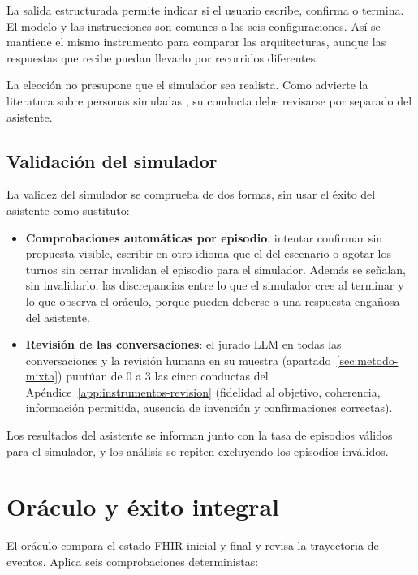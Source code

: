 La salida estructurada permite indicar si el usuario escribe, confirma o
termina. El modelo y las instrucciones son comunes a las seis configuraciones.
Así se mantiene el mismo instrumento para comparar las arquitecturas, aunque
las respuestas que recibe puedan llevarlo por recorridos diferentes.

La elección no presupone que el simulador sea realista. Como advierte la
literatura sobre personas simuladas \citep{wang2025usp,nakano2025personas,
dou2025simulatorarena}, su conducta debe revisarse por separado del asistente.

\subsection{Validación del simulador}

La validez del simulador se comprueba de dos formas, sin usar el éxito del
asistente como sustituto:

\begin{itemize}
  \item \textbf{Comprobaciones automáticas por episodio}: intentar confirmar sin
        propuesta visible, escribir en otro idioma que el del escenario o agotar
        los turnos sin cerrar invalidan el episodio para el simulador. Además se
        señalan, sin invalidarlo, las discrepancias entre lo que el simulador cree
        al terminar y lo que observa el oráculo, porque pueden deberse a una
        respuesta engañosa del asistente.
  \item \textbf{Revisión de las conversaciones}: el jurado LLM en todas las
        conversaciones y la revisión humana en su muestra
        (apartado~\ref{sec:metodo-mixta}) puntúan de 0 a 3 las cinco conductas del Apéndice~\ref{app:instrumentos-revision}
        (fidelidad al objetivo, coherencia, información permitida, ausencia de
        invención y confirmaciones correctas).
\end{itemize}

Los resultados del asistente se informan junto con la tasa de episodios válidos
para el simulador, y los análisis se repiten excluyendo los episodios inválidos.

\section{Oráculo y éxito integral}
\label{sec:metodo-oraculo}

El oráculo compara el estado FHIR inicial y final y revisa la trayectoria de
eventos. Aplica seis comprobaciones deterministas:

